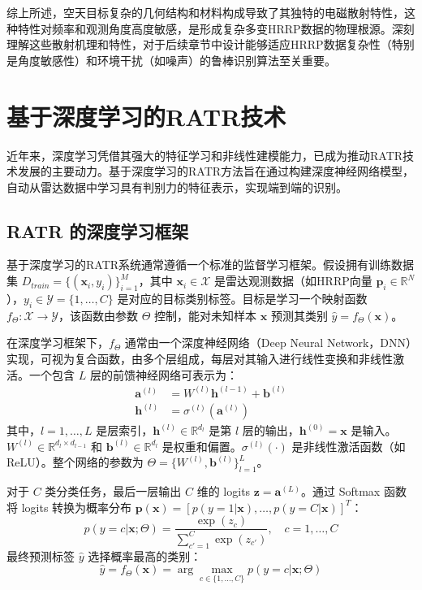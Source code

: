 综上所述，空天目标复杂的几何结构和材料构成导致了其独特的电磁散射特性，这种特性对频率和观测角度高度敏感，是形成复杂多变HRRP数据的物理根源。深刻理解这些散射机理和特性，对于后续章节中设计能够适应HRRP数据复杂性（特别是角度敏感性）和环境干扰（如噪声）的鲁棒识别算法至关重要。

\section{基于深度学习的RATR技术}
\label{sec:深度学习_ratr}

近年来，深度学习凭借其强大的特征学习和非线性建模能力，已成为推动RATR技术发展的主要动力。基于深度学习的RATR方法旨在通过构建深度神经网络模型，自动从雷达数据中学习具有判别力的特征表示，实现端到端的识别。

\subsection{RATR 的深度学习框架}
\label{subsec:深度学习_framework}

基于深度学习的RATR系统通常遵循一个标准的监督学习框架。假设拥有训练数据集 $D_{train} = \{(\mathbf{x}_i, y_i)\}_{i=1}^{M}$，其中 $\mathbf{x}_i \in \mathcal{X}$ 是雷达观测数据（如HRRP向量 $\mathbf{p}_i \in \mathbb{R}^N$），$y_i \in \mathcal{Y} = \{1, \dots, C\}$ 是对应的目标类别标签。目标是学习一个映射函数 $f_\Theta: \mathcal{X} \rightarrow \mathcal{Y}$，该函数由参数 $\Theta$ 控制，能对未知样本 $\mathbf{x}$ 预测其类别 $\hat{y} = f_\Theta(\mathbf{x})$。

在深度学习框架下，$f_\Theta$ 通常由一个深度神经网络（Deep Neural Network，DNN）实现，可视为复合函数，由多个层组成，每层对其输入进行线性变换和非线性激活。一个包含 $L$ 层的前馈神经网络可表示为：
\begin{align}
    \mathbf{a}^{(l)} &= W^{(l)} \mathbf{h}^{(l-1)} + \mathbf{b}^{(l)} \label{eq:dnn_linear} \\
    \mathbf{h}^{(l)} &= \sigma^{(l)}(\mathbf{a}^{(l)}) \label{eq:dnn_activation}
\end{align}
其中，$l=1, \dots, L$ 是层索引，$\mathbf{h}^{(l)} \in \mathbb{R}^{d_l}$ 是第 $l$ 层的输出，$\mathbf{h}^{(0)} = \mathbf{x}$ 是输入。$W^{(l)} \in \mathbb{R}^{d_l \times d_{l-1}}$ 和 $\mathbf{b}^{(l)} \in \mathbb{R}^{d_l}$ 是权重和偏置。$\sigma^{(l)}(\cdot)$ 是非线性激活函数（如ReLU）。整个网络的参数为 $\Theta = \{W^{(l)}, \mathbf{b}^{(l)}\}_{l=1}^{L}$。

对于 $C$ 类分类任务，最后一层输出 $C$ 维的 logits $\mathbf{z} = \mathbf{a}^{(L)}$。通过 Softmax 函数将 logits 转换为概率分布 $\mathbf{p}(\mathbf{x}) = [p(y=1|\mathbf{x}), \dots, p(y=C|\mathbf{x})]^T$：
\begin{equation}
    p(y=c|\mathbf{x}; \Theta) = \frac{\exp(z_c)}{\sum_{c'=1}^{C} \exp(z_{c'})}, \quad c=1, \dots, C
    \label{eq:softmax}
\end{equation}
最终预测标签 $\hat{y}$ 选择概率最高的类别：
\begin{equation}
    \hat{y} = f_\Theta(\mathbf{x}) = \arg\max_{c \in \{1, \dots, C\}} p(y=c|\mathbf{x}; \Theta)
    \label{eq:prediction}
\end{equation}

